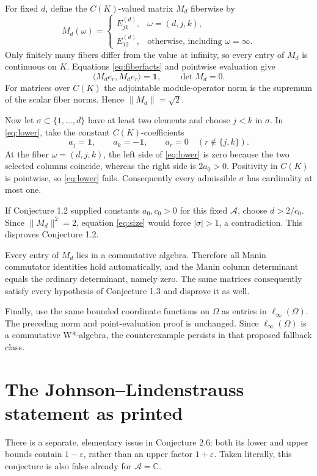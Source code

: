 \documentclass[11pt]{article}
\newcommand{\A}{\mathcal A}
\newcommand{\C}{\mathbb C}
\newcommand{\one}{\mathbf 1}
\begin{document}
For fixed $d$, define the $C(K)$-valued matrix $M_d$ fiberwise by
\begin{equation}\label{eq:family}
 M_d(\omega)=
 \begin{cases}
  E_{jk}^{(d)},&\omega=(d,j,k),\\
  E_{12}^{(d)},&\text{otherwise, including }\omega=\infty.
 \end{cases}
\end{equation}
Only finitely many fibers differ from the value at infinity, so every
entry of $M_d$ is continuous on $K$.  Equations
\eqref{eq:fiberfacts} and pointwise evaluation give
\[
 \langle M_de_r,M_de_r\rangle=\one,
 \qquad \det M_d=0.
\]
For matrices over $C(K)$ the adjointable module-operator norm is the
supremum of the scalar fiber norms.  Hence $\|M_d\|=\sqrt2$.

Now let $\sigma\subset\{1,\ldots,d\}$ have at least two elements and
choose $j<k$ in $\sigma$.  In \eqref{eq:lower}, take the constant
$C(K)$-coefficients
\[
 a_j=\one,\qquad a_k=-\one,\qquad a_r=0\quad(r\notin\{j,k\}).
\]
At the fiber $\omega=(d,j,k)$, the left side of \eqref{eq:lower} is zero
because the two selected columns coincide, whereas the right side is
$2a_0>0$.  Positivity in $C(K)$ is pointwise, so \eqref{eq:lower} fails.
Consequently every admissible $\sigma$ has cardinality at most one.

If Conjecture 1.2 supplied constants $a_0,c_0>0$ for this fixed $\A$,
choose $d>2/c_0$.  Since $\|M_d\|^2=2$, equation \eqref{eq:size} would
force $|\sigma|>1$, a contradiction.  This disproves Conjecture 1.2.

Every entry of $M_d$ lies in a commutative algebra.  Therefore all Manin
commutator identities hold automatically, and the Manin column
determinant equals the ordinary determinant, namely zero.  The same
matrices consequently satisfy every hypothesis of Conjecture 1.3 and
disprove it as well.

Finally, use the same bounded coordinate functions on $\Omega$ as entries
in $\ell_\infty(\Omega)$.  The preceding norm and point-evaluation proof is
unchanged.  Since $\ell_\infty(\Omega)$ is a commutative W*-algebra, the
counterexample persists in that proposed fallback class.

\section{The Johnson--Lindenstrauss statement as printed}

There is a separate, elementary issue in Conjecture 2.6: both its lower
and upper bounds contain $1-\varepsilon$, rather than an upper factor
$1+\varepsilon$.  Taken literally, this conjecture is also false already
for $\A=\C$.
\end{document}
